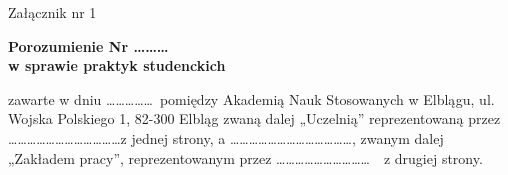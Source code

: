 \documentclass[11pt,a4paper]{article}
\begin{document}
\begin{flushright}
Załącznik nr 1
\end{flushright}

\vspace{-1em}
\begin{center}
\textbf{Porozumienie Nr \dots\dots\dots} \\[0.5em]
\textbf{w sprawie praktyk studenckich}
\end{center}
\vspace{0.5em}

\noindent
zawarte w dniu \dots\dots\dots\dots\dots\ pomiędzy Akademią Nauk Stosowanych w Elblągu, ul. Wojska Polskiego 1, 82-300 Elbląg zwaną dalej „Uczelnią” reprezentowaną przez \dots\dots\dots\dots\dots\dots\dots\dots\dots\dots\dots\dots z jednej strony, a \dots\dots\dots\dots\dots\dots\dots\dots\dots\dots\dots\dots\dots, zwanym dalej „Zakładem pracy”, reprezentowanym przez \dots\dots\dots\dots\dots\dots\dots\dots\dots\dots\ \textendash\ z drugiej strony.

\vspace{0.5em}
\end{document}
